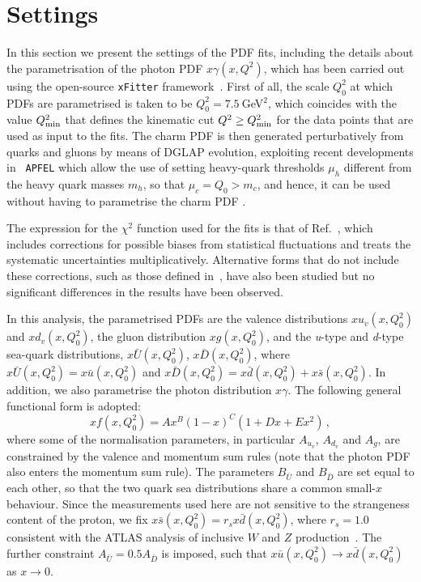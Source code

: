 \section{Settings}
\label{sec:fitsettings}

In this section we present the settings of the PDF fits, including the details about the
parametrisation of the photon PDF $x\gamma(x,Q^2)$, which has been
carried out using the open-source {\tt xFitter}
framework~\cite{Alekhin:2014irh}.
%
First of all, the scale $Q_0^2$ at which PDFs are parametrised is taken to be
$Q_0^2 = 7.5~$GeV$^2$, which coincides with the value $Q_{\rm min}^2$ that defines
the kinematic cut $Q^2 \ge Q_{\rm min}^2$ for the
data points that are used as input to the fits.
%
The charm PDF is then generated perturbatively from quarks and gluons by
means of DGLAP evolution, exploiting recent developments in {\tt
  APFEL} which allow the use of setting heavy-quark thresholds $\mu_h$
different from the heavy quark masses $m_h$, so that
$\mu_c=Q_0 > m_c$, and hence, it can be used without having to parametrise the charm PDF \cite{current:work}.

The expression for the $\chi^2$  function used for the fits is that
of Ref.~\cite{Aaron:2012qi}, which
includes corrections for possible 
biases from statistical fluctuations and treats the systematic uncertainties
multiplicatively.
%
Alternative forms that do not include these corrections, such as those
defined in~\cite{Aaron:2009aa,Abramowicz:2015mha},
have also been studied but no significant differences
in the results have been observed.
%

In this analysis, the parametrised PDFs are the valence distributions
$xu_{v}(x,Q_0^2)$ and $xd_{v}(x,Q_0^2)$, the gluon distribution $xg(x,Q_0^2)$, and the
\textit{u}-type and \textit{d}-type sea-quark distributions,
$x\bar{U}(x,Q_0^2)$, $x\bar{D}(x,Q_0^2)$, where $x\bar{U}(x,Q_0^2) = x\bar{u}(x,Q_0^2)$ and
$x\bar{D}(x,Q_0^2) = x\bar{d}(x,Q_0^2) + x\bar{s}(x,Q_0^2)$.
%
In addition, we also parametrise the photon distribution $x\gamma$.
%
The following general functional form is adopted:
\begin{equation}
  \label{eq:parametrization}
xf(x, Q_0^2) = Ax^{B}(1-x)^{C}(1+Dx+Ex^{2}) \, ,
\end{equation}
where some of the normalisation parameters, in particular $A_{u_{v}}$,
$A_{d_{v}}$ and $A_{g}$, are constrained by the valence and momentum
sum rules (note that the photon PDF also enters the momentum sum rule).
%
The parameters $B_{\bar{U}}$ and $B_{\bar{D}}$ are set equal to each
other, so that the two quark sea distributions share a common
small-$x$ behaviour.
%
Since the measurements used here are not sensitive to the strangeness
content of the proton, we fix $x\bar{s} (x, Q_0^2) = r_sx\bar{d}(x,Q_0^2)$, where
$r_s=1.0$ consistent with the ATLAS analysis of inclusive $W$
and $Z$ production~\cite{Aad:2012sb,Aaboud:2016btc}.
%
The further constraint $A_{\bar{U}} = 0.5 A_{\bar{D}}$ is imposed,
such that $x\bar{u}(x,Q_0^2) \to x\bar{d}(x,Q_0^2)$ as $x \to 0$.  

